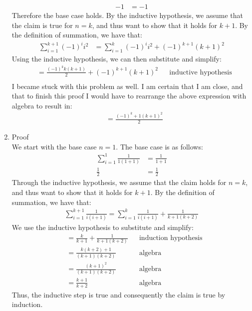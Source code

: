 \documentclass{article}
\begin{document}
\begin{enumerate}
\begin{align}
	-1&=-1
	\end{align}
	Therefore the base case holds. By the inductive hypothesis, we assume that the claim is true for $n=k$, and thus want to show that it holds for $k+1$. By the definition of summation, we have that:
	\begin{align}
	\sum^{k+1}_{i=1}(-1)^ii^2&=\sum^{k}_{i=1}(-1)^ii^2+(-1)^{k+1}(k+1)^2 
	\end{align}
	Using the inductive hypothesis, we can then substitute and simplify:
	\begin{align}
	&=\frac{(-1)^kk(k+1)}{2} +(-1)^{k+1}(k+1)^2 && \text{inductive hypothesis}\\
	\end{align}
	I became stuck with this problem as well. I am certain that I am close, and that to finish this proof I would have to rearrange the above expression with algebra to result in:
	\begin{align}
	&=\frac{(-1)^k+1(k+1)^2}{2}
	\end{align}
	\item Proof \\
	We start with the base case $n=1$. The base case is as follows:
	\begin{align}
	\sum_{i=1}^{1}\frac{1}{1(1+1)}&=\frac{1}{1+1}\\
	\frac{1}{2}&=\frac{1}{2}
	\end{align}
	Through the inductive hypothesis, we assume that the claim holds for $n=k$, and thus want to show that it holds for $k+1$. By the definition of summation, we have that:
	\begin{align}
	\sum_{i=1}^{k+1}\frac{1}{i(i+1)}=\sum_{i=1}^{k}\frac{1}{i(i+1)}+\frac{1}{k+1(k+2)}
	\end{align}
	We use the inductive hypothesis to substitute and simplify:
	\begin{align}
	&=\frac{k}{k+1}+\frac{1}{k+1(k+2)} && \text{induction hypothesis} \\
	&=\frac{k(k+2)+1}{(k+1)(k+2)} && \text{algebra} \\
	&=\frac{(k+1)^2}{(k+1)(k+2)} && \text{algebra}\\
	&=\frac{k+1}{k+2} && \text{algebra}
	\end{align}
	Thus, the inductive step is true and consequently the claim is true by induction. \\

\end{enumerate}
\end{document}
